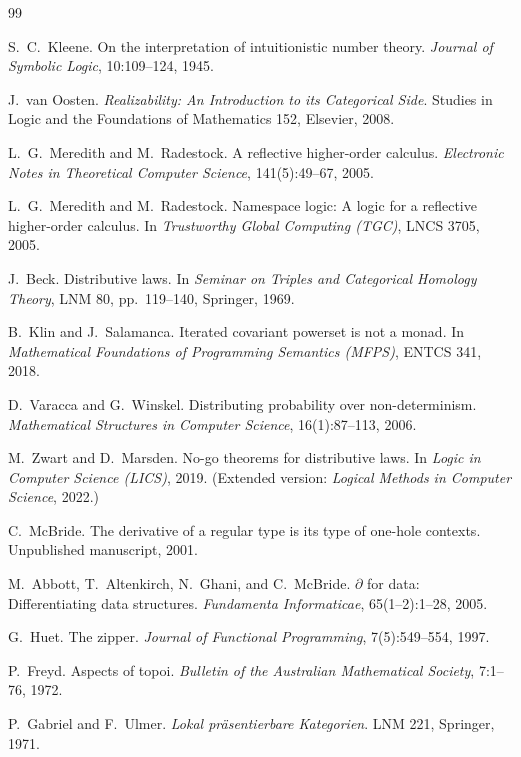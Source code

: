 \documentclass[11pt]{article}
\theoremstyle{definition}
\theoremstyle{plain}
\begin{document}
\begin{thebibliography}{99}

 S.~C.\ Kleene. On the interpretation of intuitionistic
number theory. \emph{Journal of Symbolic Logic}, 10:109--124, 1945.

 J.\ van Oosten. \emph{Realizability: An Introduction to
its Categorical Side}. Studies in Logic and the Foundations of Mathematics
152, Elsevier, 2008.

 L.~G.\ Meredith and M.\ Radestock. A reflective
higher-order calculus. \emph{Electronic Notes in Theoretical Computer
Science}, 141(5):49--67, 2005.

 L.~G.\ Meredith and M.\ Radestock. Namespace
logic: A logic for a reflective higher-order calculus. In \emph{Trustworthy
Global Computing (TGC)}, LNCS 3705, 2005.

 J.\ Beck. Distributive laws. In \emph{Seminar on Triples and
Categorical Homology Theory}, LNM 80, pp.\ 119--140, Springer, 1969.

 B.\ Klin and J.\ Salamanca. Iterated covariant
powerset is not a monad. In \emph{Mathematical Foundations of Programming
Semantics (MFPS)}, ENTCS 341, 2018.

 D.\ Varacca and G.\ Winskel. Distributing
probability over non-determinism. \emph{Mathematical Structures in Computer
Science}, 16(1):87--113, 2006.

 M.\ Zwart and D.\ Marsden. No-go theorems for
distributive laws. In \emph{Logic in Computer Science (LICS)}, 2019.
(Extended version: \emph{Logical Methods in Computer Science}, 2022.)

 C.\ McBride. The derivative of a regular type is its type
of one-hole contexts. Unpublished manuscript, 2001.

 M.\ Abbott, T.\ Altenkirch, N.\ Ghani, and C.\ McBride.
$\partial$ for data: Differentiating data structures. \emph{Fundamenta
Informaticae}, 65(1--2):1--28, 2005.

 G.\ Huet. The zipper. \emph{Journal of Functional
Programming}, 7(5):549--554, 1997.

 P.\ Freyd. Aspects of topoi. \emph{Bulletin of the
Australian Mathematical Society}, 7:1--76, 1972.

 P.\ Gabriel and F.\ Ulmer. \emph{Lokal
pr\"asentierbare Kategorien}. LNM 221, Springer, 1971.


\end{thebibliography}
\end{document}
